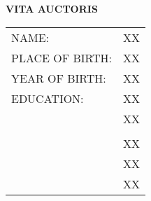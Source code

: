 \documentclass[
11pt, %
oneside, %
english, %
doublespacing,
liststotoc, %
parskip, %
consistentlayout, %
]{MastersDoctoralThesis} %
\begin{document}
\printbibliography[heading=bibintoc]


\appendix


\newpage
{}
{}
\thispagestyle{plain}
{\huge{\bf{VITA AUCTORIS}}}
\vspace{1cm}

\begin{tabular}{ l l }
  NAME: & XX \\
  PLACE OF BIRTH: & XX \\
  YEAR OF BIRTH: & XX \\
  EDUCATION: & XX \\
        & XX \\
                  &\quad \\
        & XX \\
        & XX \\
        & XX
          
\end{tabular}

\vspace{1.5cm}
\end{document}
